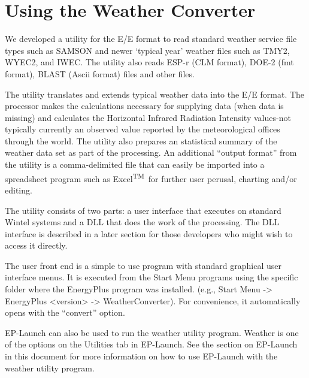 \section{Using the Weather Converter}\label{using-the-weather-converter}

We developed a utility for the E/E format to read standard weather service file types such as SAMSON and newer `typical year' weather files such as TMY2, WYEC2, and IWEC. The utility also reads ESP-r (CLM format), DOE-2 (fmt format), BLAST (Ascii format) files and other files.

The utility translates and extends typical weather data into the E/E format. The processor makes the calculations necessary for supplying data (when data is missing) and calculates the Horizontal Infrared Radiation Intensity values-not typically currently an observed value reported by the meteorological offices through the world. The utility also prepares an statistical summary of the weather data set as part of the processing. An additional ``output format'' from the utility is a comma-delimited file that can easily be imported into a spreadsheet program such as Excel\textsuperscript{TM}\ for further user perusal, charting and/or editing.

The utility consists of two parts: a user interface that executes on standard Wintel systems and a DLL that does the work of the processing. The DLL interface is described in a later section for those developers who might wish to access it directly.

The user front end is a simple to use program with standard graphical user interface menus. It is executed from the Start Menu programs using the specific folder where the EnergyPlus program was installed. (e.g., Start Menu -\textgreater{} EnergyPlus \textless{}version\textgreater{} -\textgreater{} WeatherConverter). For convenience, it automatically opens with the ``convert'' option.

EP-Launch can also be used to run the weather utility program. Weather is one of the options on the Utilities tab in EP-Launch. See the section on EP-Launch in this document for more information on how to use EP-Launch with the weather utility program.

